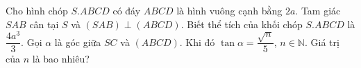\begin{ex}
Cho hình chóp $S.ABCD$ có đáy $ABCD$ là hình vuông cạnh bằng $2a$. Tam giác $SAB$ cân tại $S$ và $(SAB)\perp(ABCD)$. Biết thể tích của khối chóp $S.ABCD$ là $\dfrac{4a^3}{3}$. Gọi $\alpha$ là góc giữa $SC$ và $(ABCD)$. Khi đó $\tan\alpha=\dfrac{\sqrt n}{5}$, $n\in\mathbb N$. Giá trị của $n$ là bao nhiêu?
\end{ex}
